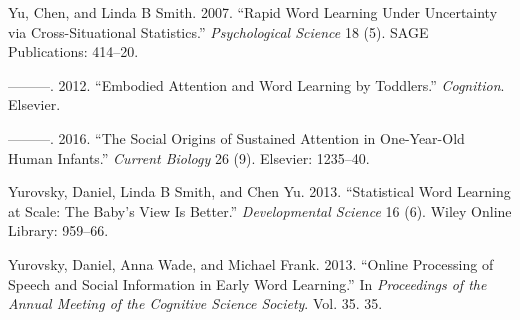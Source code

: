 \documentclass[10pt, letterpaper]{article}
\begin{document}
\leavevmode\hypertarget{ref-yu2007rapid}{}%
Yu, Chen, and Linda B Smith. 2007. ``Rapid Word Learning Under
Uncertainty via Cross-Situational Statistics.'' \emph{Psychological
Science} 18 (5). SAGE Publications: 414--20.

\leavevmode\hypertarget{ref-yu2012embodied}{}%
---------. 2012. ``Embodied Attention and Word Learning by Toddlers.''
\emph{Cognition}. Elsevier.

\leavevmode\hypertarget{ref-yu2016social}{}%
---------. 2016. ``The Social Origins of Sustained Attention in
One-Year-Old Human Infants.'' \emph{Current Biology} 26 (9). Elsevier:
1235--40.

\leavevmode\hypertarget{ref-yurovsky2013statistical}{}%
Yurovsky, Daniel, Linda B Smith, and Chen Yu. 2013. ``Statistical Word
Learning at Scale: The Baby's View Is Better.'' \emph{Developmental
Science} 16 (6). Wiley Online Library: 959--66.

\leavevmode\hypertarget{ref-yurovsky2013online}{}%
Yurovsky, Daniel, Anna Wade, and Michael Frank. 2013. ``Online
Processing of Speech and Social Information in Early Word Learning.'' In
\emph{Proceedings of the Annual Meeting of the Cognitive Science
Society}. Vol. 35. 35.


\end{document}
